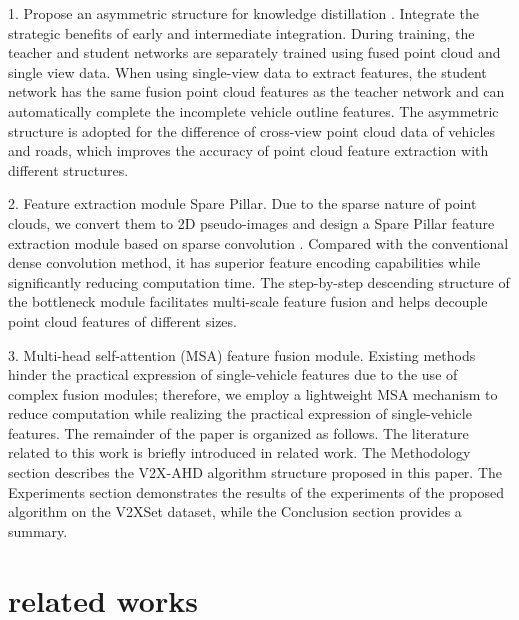 \documentclass[lettersize,journal]{IEEEtran}
\begin{document}
1. Propose an asymmetric structure for knowledge distillation \cite{3}\cite{4}\cite{5}. Integrate the strategic benefits of early and intermediate integration. During training, the teacher and student networks are separately trained using fused point cloud and single view data. When using single-view data to extract features, the student network has the same fusion point cloud features as the teacher network and can automatically complete the incomplete vehicle outline features. The asymmetric structure is adopted for the difference of cross-view point cloud data of vehicles and roads, which improves the accuracy of point cloud feature extraction with different structures.

2. Feature extraction module Spare Pillar. Due to the sparse nature of point clouds, we convert them to 2D pseudo-images and design a Spare Pillar feature extraction module based on sparse convolution \cite{7}. Compared with the conventional dense convolution method, it has superior feature encoding capabilities while significantly reducing computation time. The step-by-step descending structure of the bottleneck module facilitates multi-scale feature fusion and helps decouple point cloud features of different sizes.

3. Multi-head self-attention (MSA) feature fusion module. Existing methods hinder the practical expression of single-vehicle features due to the use of complex fusion modules; therefore, we employ a lightweight MSA mechanism to reduce computation while realizing the practical expression of single-vehicle features.
The remainder of the paper is organized as follows. The literature related to this work is briefly introduced in related work. The Methodology section describes the V2X-AHD algorithm structure proposed in this paper. The Experiments section demonstrates the results of the experiments of the proposed algorithm on the V2XSet\cite{8} dataset, while the Conclusion section provides a summary.


\section{related works}
\end{document}
